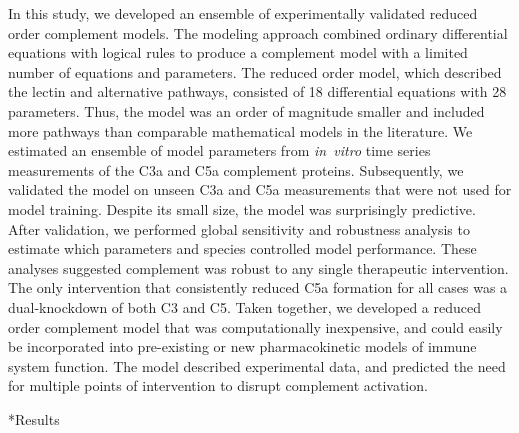 \documentclass[12pt]{article}
\makeatletter
\renewcommand\section{\@startsection
	{subsection}{2}{0mm}
	{-0.2in}
	{0.05\baselineskip}
	{\normalfont\large\bfseries}}
\makeatother
\begin{document}
In this study, we developed an ensemble of experimentally validated reduced order complement models.
The modeling approach combined ordinary differential equations with logical rules to produce a complement model with a limited number of equations and parameters.
The reduced order model,  which described the lectin and alternative pathways, consisted of 18 differential equations with 28 parameters.
Thus, the model was an order of magnitude smaller and included more pathways than comparable mathematical models in the literature.
We estimated an ensemble of model parameters from \textit{in~vitro} time series measurements of the C3a and C5a complement proteins.
Subsequently, we validated the model on unseen C3a and C5a measurements that were not used for model training.
Despite its small size, the model was surprisingly predictive.
After validation, we performed global sensitivity and robustness analysis to estimate which parameters and species
controlled model performance. These analyses suggested complement was robust to any single therapeutic intervention.
The only intervention that consistently reduced C5a formation for all cases was a dual-knockdown of both C3 and C5.
Taken together, we developed a reduced order complement model that was computationally inexpensive,
and could easily be incorporated into pre-existing or new pharmacokinetic models of immune system function.
The model described experimental data, and predicted the need for multiple points of intervention to disrupt complement activation.

\clearpage

\section*{Results}
\end{document}
